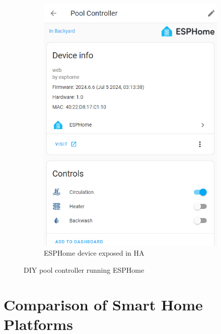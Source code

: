 \begin{figure}[H]
\begin{subfigure}{.5\textwidth}
        \includegraphics[width=.975\linewidth]{img/ha-esphome-pool-controler.png}
        \caption{ESPHome device exposed in HA}
    \end{subfigure}
    \caption{DIY pool controller running ESPHome}
    \label{fig:ESPHome_Poolcontroler}
\end{figure}

\newpage


\section{Comparison of Smart Home Platforms}

